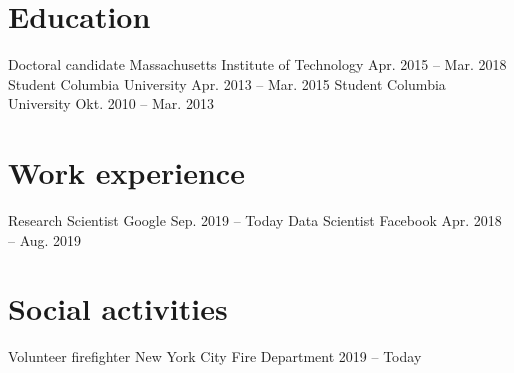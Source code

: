 \documentclass{../km_cv}
\begin{document}
%
\makeheader
%
\makecvfooter
%
\vspace*{1cm}
%
\section{Education}
%
\cventry
    {Doctoral candidate}
    {Massachusetts Institute of Technology}
    {Apr. 2015 -- Mar. 2018}%
%
\cventry
    {Student}
    {Columbia University}
    {Apr. 2013 -- Mar. 2015}%
%
\cventry
    {Student}
    {Columbia University}
    {Okt. 2010 -- Mar. 2013}%
%
%
\section{Work experience}
%
\cventry
    {Research Scientist}
    {Google}
    {Sep. 2019 -- Today}%
\cvtext{%
    \lipsum[4][7-12]
}
%
\cventry
    {Data Scientist}
    {Facebook}
    {Apr. 2018 -- Aug. 2019}%
\cvtext{%
    \lipsum[7][7-12]
}
%
\section{Social activities}
%
\cventry
    {Volunteer firefighter}
    {New York City Fire Department}
    {2019 -- Today}
\cvtext{%
\lipsum[1][7-12]
}
%
\end{document}

